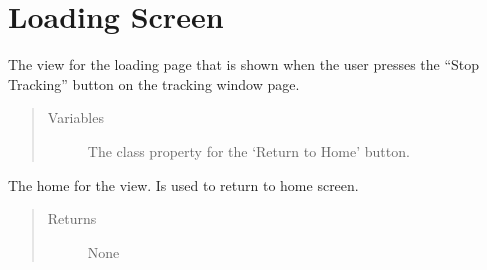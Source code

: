 \documentclass[letterpaper,10pt,english]{sphinxmanual}
\begin{document}
\chapter{Loading Screen}
\label{\detokenize{index:module-src.Views.View_LoadingScreen}}\label{\detokenize{index:loading-screen}}

\begin{fulllineitems}
\label{\detokenize{index:src.Views.View_LoadingScreen.LoadingWindow}}
The view for the loading page that is shown when the user presses the “Stop Tracking” button on the tracking window page.
\begin{quote}\begin{description}
\item[{Variables}] \leavevmode
{} \textendash{} The class property for the ‘Return to Home’ button.

\end{description}\end{quote}

\begin{fulllineitems}
\label{\detokenize{index:src.Views.View_LoadingScreen.LoadingWindow.BtnHome}}
The home for the view. Is used to return to home screen.
\begin{quote}\begin{description}
\item[{Returns}] \leavevmode
None

\end{description}\end{quote}

\end{fulllineitems}



\end{fulllineitems}
\end{document}
